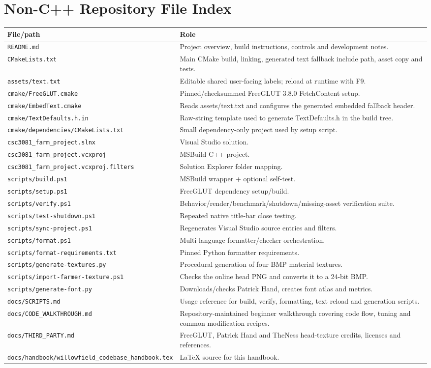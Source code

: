 \documentclass[11pt,a4paper,openany]{book}
\newcommand{\file}[1]{\nolinkurl{#1}}
\newcommand{\pathrow}[2]{\file{#1} & #2\\}
\begin{document}
\chapter{Non-C++ Repository File Index}
\begin{longtable}{@{}p{}p{}@{}}
	\toprule
	File/path & Role \\
	\midrule
	\endhead
	\pathrow{README.md}{Project overview, build instructions, controls and development notes.}
	\pathrow{CMakeLists.txt}{Main CMake build, linking, generated text fallback include path, asset copy and tests.}
	\pathrow{assets/text.txt}{Editable shared user-facing labels; reload at runtime with F9.}
	\pathrow{cmake/FreeGLUT.cmake}{Pinned/checksummed FreeGLUT 3.8.0 FetchContent setup.}
	\pathrow{cmake/EmbedText.cmake}{Reads assets/text.txt and configures the generated embedded fallback header.}
	\pathrow{cmake/TextDefaults.h.in}{Raw-string template used to generate TextDefaults.h in the build tree.}
	\pathrow{cmake/dependencies/CMakeLists.txt}{Small dependency-only project used by setup script.}
	\pathrow{csc3081\_farm\_project.slnx}{Visual Studio solution.}
	\pathrow{csc3081\_farm\_project.vcxproj}{MSBuild C++ project.}
	\pathrow{csc3081\_farm\_project.vcxproj.filters}{Solution Explorer folder mapping.}
	\pathrow{scripts/build.ps1}{MSBuild wrapper + optional self-test.}
	\pathrow{scripts/setup.ps1}{FreeGLUT dependency setup/build.}
	\pathrow{scripts/verify.ps1}{Behavior/render/benchmark/shutdown/missing-asset verification suite.}
	\pathrow{scripts/test-shutdown.ps1}{Repeated native title-bar close testing.}
	\pathrow{scripts/sync-project.ps1}{Regenerates Visual Studio source entries and filters.}
	\pathrow{scripts/format.ps1}{Multi-language formatter/checker orchestration.}
	\pathrow{scripts/format-requirements.txt}{Pinned Python formatter requirements.}
	\pathrow{scripts/generate-textures.py}{Procedural generation of four BMP material textures.}
	\pathrow{scripts/import-farmer-texture.ps1}{Checks the online head PNG and converts it to a 24-bit BMP.}
	\pathrow{scripts/generate-font.py}{Downloads/checks Patrick Hand, creates font atlas and metrics.}
	\pathrow{docs/SCRIPTS.md}{Usage reference for build, verify, formatting, text reload and generation scripts.}
	\pathrow{docs/CODE_WALKTHROUGH.md}{Repository-maintained beginner walkthrough covering code flow, tuning and common modification recipes.}
	\pathrow{docs/THIRD\_PARTY.md}{FreeGLUT, Patrick Hand and TheNess head-texture credits, licenses and references.}
	\pathrow{docs/handbook/willowfield_codebase_handbook.tex}{LaTeX source for this handbook.}

\end{longtable}
\end{document}
